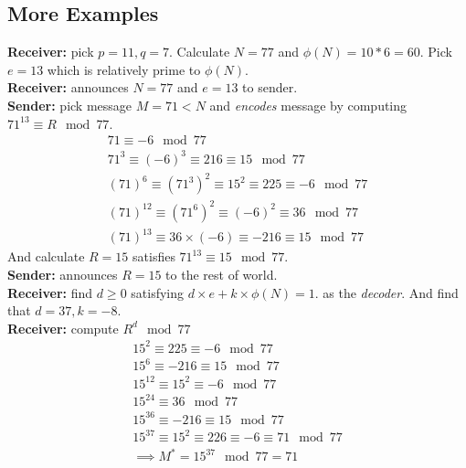 \documentclass[11pt]{article}
\begin{document}
	    \subsection{More Examples}
	    \begin{example}
	        \textbf{Receiver: } pick $p = 11, q = 7$. Calculate $N = 77$ and $\phi(N) = 10 * 6 = 60$. Pick $e=13$ which is relatively prime to $\phi(N)$.\\
	       \textbf{Receiver: } announces $N=77$ and $e=13$ to sender. \\
	       \textbf{Sender: } pick message $M=71<N$ and \emph{encodes} message by computing $71^{13} \equiv R \mod 77$. 
	       \begin{gather*}
	           71 \equiv -6 \mod 77 \\
	           71^3 \equiv (-6)^3 \equiv 216 \equiv 15 \mod 77 \\
	           (71)^6 \equiv (71^3)^2 \equiv 15^2 \equiv 225 \equiv -6 \mod 77 \\
	           (71)^{12} \equiv (71^6)^2 \equiv (-6)^2 \equiv 36 \mod 77 \\
	           (71)^{13} \equiv 36 \times (-6) \equiv -216 \equiv 15 \mod 77
	       \end{gather*}
	       And calculate $R=15$ satisfies $71^{13} \equiv 15 \mod 77$. \\
	       \textbf{Sender: } announces $R = 15$ to the rest of world. \\
	       \textbf{Receiver: } find $d \geq 0$ satisfying $d \times e + k \times \phi(N) = 1$. as the \emph{decoder}. And find that $d=37, k=-8$. \\
	       \textbf{Receiver: } compute $R^d \mod 77$ 
	       \begin{gather*}
	           15^2 \equiv 225 \equiv -6 \mod 77 \\
	           15^6 \equiv -216 \equiv 15 \mod 77 \\
	           15^{12} \equiv 15^2 \equiv -6 \mod 77 \\
	           15^{24} \equiv 36 \mod 77 \\
	           15^{36} \equiv -216 \equiv 15 \mod 77 \\
	           15^{37} \equiv 15^2 \equiv 226 \equiv -6 \equiv 71 \mod 77 \\
	           \implies M^* = 15^{37} \mod 77 = 71
	       \end{gather*}
	    \end{example}
	    
\end{document}
